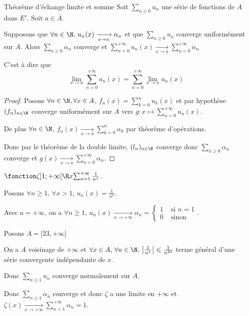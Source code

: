 \begin{theoreme}{Théorème d'échange limite et somme}{}
    Soit $\sum_{n \geqslant 0 } u_n$ une série de fonctions de $A$ dans $E'$. Soit $a \in \bar A$. 

    Supposons que $\forall n \in \N, \, u_n(x) \xrightarrow[x \to a]{} \alpha_n$ et que 
    $\sum_{n \geqslant 0} u_n$ converge uniformément sur $A$. Alors 
    $\displaystyle \sum_{n \geqslant 0} \alpha_n$ converge et 
    $ \displaystyle \sum_{n = 0 }^{+ \infty    } u_n(x) \xrightarrow[x \to a]{} \sum_{n = 0}^{+ \infty} \alpha_n$

    C'est à dire que 
    $$\lim_{x \to a} \sum_{n = 0}^{+ \infty} u_n(x) = \sum_{n = 0}^{+ \infty} \lim_{x \to a} u_n(x)$$
\end{theoreme}


\begin{proof}
    Posons $\forall n \in \N, \forall x \in A$, $\displaystyle f_n(x) = \sum_{k = 0}^n u_k(x)$ et par hypothèse 
    $(f_n)_{n \in \N}$ converge uniformément sur $A$ vers $\displaystyle g : x \mapsto \sum_{n = 0}^{+ \infty} u_n(x)$.

    De plus $\displaystyle \forall n \in \N$, $\displaystyle f_n(x) \xrightarrow[x \to a]{} \sum_{k = 0}^n \alpha_k$ par théorème d'opérations. 

    Donc par le théorème de la double limite, $(l_n)_{n \in \N}$ converge donc $\displaystyle \sum_{n \geqslant 0} \alpha_n$ converge et 
    $\displaystyle g(x) \xrightarrow[x \to a]{} \sum_{n = 0}^{+ \infty} \alpha_n$.
\end{proof}

\begin{exemple}
    $\fonction \zeta{]1; +\infty[}{\R}{x}{\sum_{n = 1}^{+ \infty} \frac 1 {n^x}}$.

    Posons $\forall n \geqslant 1, \, \forall x > 1, \, u_n(x) = \frac 1 {n^x}$.

    Avec $a = + \infty$, on a $\forall n \geqslant 1, \, u_n(x) \xrightarrow[x \to +\infty]{} \alpha_n = \left\{\begin{array}{cc} 1 & \text{ si } n = 1 \\ 0 & \text{ sinon } \end{array} \right.$.
        
    Posons $A = [23, + \infty[$

    On a $A$ voisinage de $+ \infty$ et $\forall x \in A, \, \forall n \in \N, \, \left| \frac{1}{n^x} \right| \leqslant \frac 1 {n^{23}}$ 
    terme général d'une série convergente indépendante de $x$.

    Donc $\displaystyle \sum_{n \geqslant 1} u_n$ converge normalement sur $A$. 

    Donc $\displaystyle \sum_{n \geqslant 1} \alpha_n$ converge et donc $\zeta$ a une limite en $+ \infty$ et 
    $\zeta(x) \xrightarrow[x \to +\infty]{} \sum_{n = 1 }^{+ \infty } \alpha_n = 1$.

\end{exemple}

